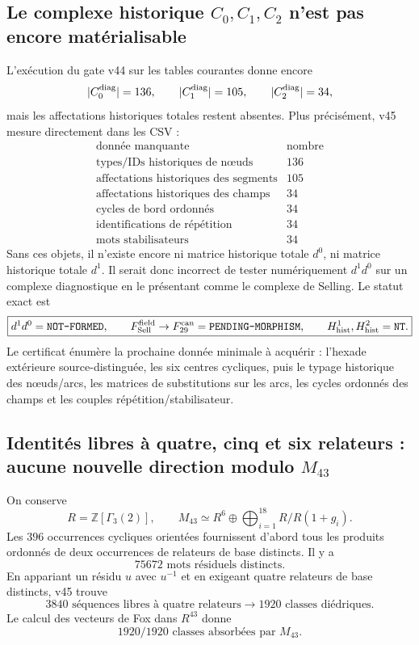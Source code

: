 \documentclass[11pt,a4paper]{article}
\newcommand{\certPending}{\texttt{PENDING-MORPHISM}}
\newcommand{\certNT}{\texttt{NT}}
\begin{document}
\subsection{Le complexe historique $C_0,C_1,C_2$ n'est pas encore matérialisable}

L'exécution du gate v44 sur les tables courantes donne encore
\[
 |C_0^{\rm diag}|=136,
 \qquad |C_1^{\rm diag}|=105,
 \qquad |C_2^{\rm diag}|=34,
\]
mais les affectations historiques totales restent absentes. Plus précisément, v45 mesure directement dans les CSV :
\[
 \boxed{
 \begin{array}{c|c}
 \text{donnée manquante}&\text{nombre}\\ \hline
 \text{types/IDs historiques de nœuds}&136\\
 \text{affectations historiques des segments}&105\\
 \text{affectations historiques des champs}&34\\
 \text{cycles de bord ordonnés}&34\\
 \text{identifications de répétition}&34\\
 \text{mots stabilisateurs}&34
 \end{array}}
\]
Sans ces objets, il n'existe encore ni matrice historique totale $d^0$, ni matrice historique totale $d^1$. Il serait donc incorrect de tester numériquement $d^1d^0$ sur un complexe diagnostique en le présentant comme le complexe de Selling. Le statut exact est
\[
 \boxed{
 d^1d^0=\texttt{NOT-FORMED},\qquad
 F_{\rm Sell}^{\rm field}\to F_{29}^{\rm can}=\certPending,
 \qquad H^1_{\rm hist},H^2_{\rm hist}=\certNT.}
\]
Le certificat  énumère la prochaine donnée minimale à acquérir : l'hexade extérieure source-distinguée, les six centres cycliques, puis le typage historique des nœuds/arcs, les matrices de substitutions sur les arcs, les cycles ordonnés des champs et les couples répétition/stabilisateur.

\subsection{Identités libres à quatre, cinq et six relateurs : aucune nouvelle direction modulo $M_{43}$}

On conserve
\[
 R=\mathbb Z[\Gamma_3(2)],
 \qquad
 M_{43}\simeq R^6\oplus\bigoplus_{i=1}^{18}R/R(1+g_i).
\]
Les $396$ occurrences cycliques orientées fournissent d'abord tous les produits ordonnés de deux occurrences de relateurs de base distincts. Il y a
\[
 \boxed{75672\text{ mots résiduels distincts}.}
\]
En appariant un résidu $u$ avec $u^{-1}$ et en exigeant quatre relateurs de base distincts, v45 trouve
\[
 3840\text{ séquences libres à quatre relateurs}
 \longrightarrow
 \boxed{1920\text{ classes diédriques}.}
\]
Le calcul des vecteurs de Fox dans $R^{43}$ donne
\[
 \boxed{1920/1920\text{ classes absorbées par }M_{43}.}
\]
\end{document}
